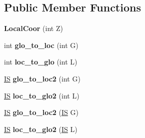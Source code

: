 \subsection*{Public Member Functions}
\begin{DoxyCompactItemize}
\item 
\hypertarget{classLocalCoor_a00f6c0c9e48e46f15e1aaf36331fedeb}{{\bfseries Local\+Coor} (int Z)}\label{classLocalCoor_a00f6c0c9e48e46f15e1aaf36331fedeb}

\item 
\hypertarget{classLocalCoor_ab96f489ba970f19b22e75f94bbec99c1}{int {\bfseries glo\+\_\+to\+\_\+loc} (int G)}\label{classLocalCoor_ab96f489ba970f19b22e75f94bbec99c1}

\item 
\hypertarget{classLocalCoor_ab5da8e4b3f6c32fbf6636aaa47e04adc}{int {\bfseries loc\+\_\+to\+\_\+glo} (int L)}\label{classLocalCoor_ab5da8e4b3f6c32fbf6636aaa47e04adc}

\item 
\hypertarget{classLocalCoor_ab7d0ec331227de0fb48ae21f9248c8e4}{\hyperlink{structIS}{I\+S} {\bfseries glo\+\_\+to\+\_\+loc2} (int G)}\label{classLocalCoor_ab7d0ec331227de0fb48ae21f9248c8e4}

\item 
\hypertarget{classLocalCoor_aaa28a5d11ee863dae88978a86d614430}{\hyperlink{structIS}{I\+S} {\bfseries loc\+\_\+to\+\_\+glo2} (int L)}\label{classLocalCoor_aaa28a5d11ee863dae88978a86d614430}

\item 
\hypertarget{classLocalCoor_a23ab9aa62ccd6d47003b14f018ec7105}{\hyperlink{structIS}{I\+S} {\bfseries glo\+\_\+to\+\_\+loc2} (\hyperlink{structIS}{I\+S} G)}\label{classLocalCoor_a23ab9aa62ccd6d47003b14f018ec7105}

\item 
\hypertarget{classLocalCoor_a622363b5c88ea09503aa4c9f542d63c8}{\hyperlink{structIS}{I\+S} {\bfseries loc\+\_\+to\+\_\+glo2} (\hyperlink{structIS}{I\+S} L)}\label{classLocalCoor_a622363b5c88ea09503aa4c9f542d63c8}

\end{DoxyCompactItemize}

